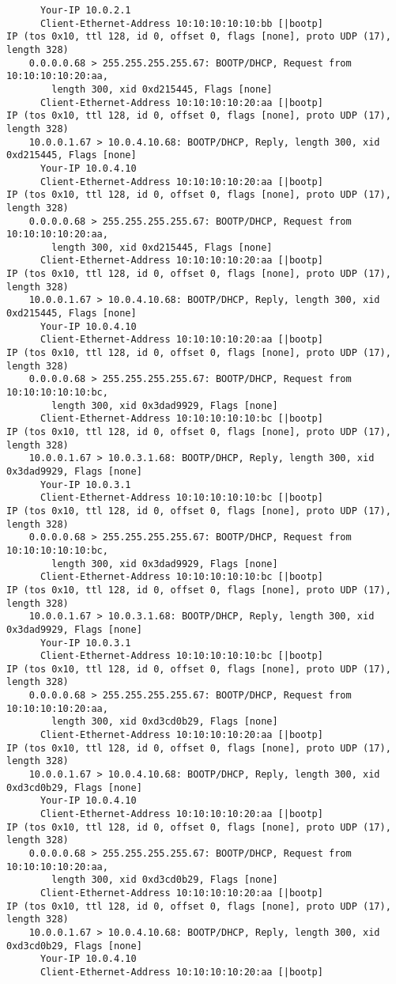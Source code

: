 \documentclass[a4paper,12pt]{article}
\begin{document}
\begin{Verbatim}
	  Your-IP 10.0.2.1
	  Client-Ethernet-Address 10:10:10:10:10:bb [|bootp]
IP (tos 0x10, ttl 128, id 0, offset 0, flags [none], proto UDP (17), length 328) 
	0.0.0.0.68 > 255.255.255.255.67: BOOTP/DHCP, Request from 10:10:10:10:20:aa, 
		length 300, xid 0xd215445, Flags [none]
	  Client-Ethernet-Address 10:10:10:10:20:aa [|bootp]
IP (tos 0x10, ttl 128, id 0, offset 0, flags [none], proto UDP (17), length 328) 
	10.0.0.1.67 > 10.0.4.10.68: BOOTP/DHCP, Reply, length 300, xid 0xd215445, Flags [none]
	  Your-IP 10.0.4.10
	  Client-Ethernet-Address 10:10:10:10:20:aa [|bootp]
IP (tos 0x10, ttl 128, id 0, offset 0, flags [none], proto UDP (17), length 328) 
	0.0.0.0.68 > 255.255.255.255.67: BOOTP/DHCP, Request from 10:10:10:10:20:aa, 
		length 300, xid 0xd215445, Flags [none]
	  Client-Ethernet-Address 10:10:10:10:20:aa [|bootp]
IP (tos 0x10, ttl 128, id 0, offset 0, flags [none], proto UDP (17), length 328) 
	10.0.0.1.67 > 10.0.4.10.68: BOOTP/DHCP, Reply, length 300, xid 0xd215445, Flags [none]
	  Your-IP 10.0.4.10
	  Client-Ethernet-Address 10:10:10:10:20:aa [|bootp]
IP (tos 0x10, ttl 128, id 0, offset 0, flags [none], proto UDP (17), length 328) 
	0.0.0.0.68 > 255.255.255.255.67: BOOTP/DHCP, Request from 10:10:10:10:10:bc, 
		length 300, xid 0x3dad9929, Flags [none]
	  Client-Ethernet-Address 10:10:10:10:10:bc [|bootp]
IP (tos 0x10, ttl 128, id 0, offset 0, flags [none], proto UDP (17), length 328) 
	10.0.0.1.67 > 10.0.3.1.68: BOOTP/DHCP, Reply, length 300, xid 0x3dad9929, Flags [none]
	  Your-IP 10.0.3.1
	  Client-Ethernet-Address 10:10:10:10:10:bc [|bootp]
IP (tos 0x10, ttl 128, id 0, offset 0, flags [none], proto UDP (17), length 328) 
	0.0.0.0.68 > 255.255.255.255.67: BOOTP/DHCP, Request from 10:10:10:10:10:bc, 
		length 300, xid 0x3dad9929, Flags [none]
	  Client-Ethernet-Address 10:10:10:10:10:bc [|bootp]
IP (tos 0x10, ttl 128, id 0, offset 0, flags [none], proto UDP (17), length 328) 
	10.0.0.1.67 > 10.0.3.1.68: BOOTP/DHCP, Reply, length 300, xid 0x3dad9929, Flags [none]
	  Your-IP 10.0.3.1
	  Client-Ethernet-Address 10:10:10:10:10:bc [|bootp]
IP (tos 0x10, ttl 128, id 0, offset 0, flags [none], proto UDP (17), length 328) 
	0.0.0.0.68 > 255.255.255.255.67: BOOTP/DHCP, Request from 10:10:10:10:20:aa, 
		length 300, xid 0xd3cd0b29, Flags [none]
	  Client-Ethernet-Address 10:10:10:10:20:aa [|bootp]
IP (tos 0x10, ttl 128, id 0, offset 0, flags [none], proto UDP (17), length 328) 
	10.0.0.1.67 > 10.0.4.10.68: BOOTP/DHCP, Reply, length 300, xid 0xd3cd0b29, Flags [none]
	  Your-IP 10.0.4.10
	  Client-Ethernet-Address 10:10:10:10:20:aa [|bootp]
IP (tos 0x10, ttl 128, id 0, offset 0, flags [none], proto UDP (17), length 328) 
	0.0.0.0.68 > 255.255.255.255.67: BOOTP/DHCP, Request from 10:10:10:10:20:aa, 
		length 300, xid 0xd3cd0b29, Flags [none]
	  Client-Ethernet-Address 10:10:10:10:20:aa [|bootp]
IP (tos 0x10, ttl 128, id 0, offset 0, flags [none], proto UDP (17), length 328) 
	10.0.0.1.67 > 10.0.4.10.68: BOOTP/DHCP, Reply, length 300, xid 0xd3cd0b29, Flags [none]
	  Your-IP 10.0.4.10
	  Client-Ethernet-Address 10:10:10:10:20:aa [|bootp]
\end{Verbatim}
\end{document}
